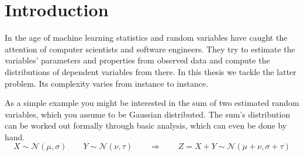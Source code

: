 \documentclass[11pt,a4paper]{book}
\begin{document}
\cleardoublepage

\tableofcontents

\cleardoublepage

\mainmatter
\pagestyle{fancy}

\chapter{Introduction}

In the age of machine learning statistics and random variables have caught the
attention of computer scientists and software engineers. They try to estimate
the variables' parameters and properties from observed data and compute the
distributions of dependent variables from there. In this thesis we tackle the
latter problem. Its complexity varies from instance to instance.

As a simple example you might be interested in the sum of two estimated random
variables, which you assume to be Gaussian distributed. The sum's distribution
can be worked out formally through basic analysis, which can even be done by
hand.
\begin{equation*}
  X \sim \mathcal{N}(\mu, \sigma) \qquad Y \sim \mathcal{N}(\nu, \tau) \qquad \Rightarrow \qquad Z = X + Y \sim \mathcal{N}(\mu + \nu, \sigma + \tau)
\end{equation*}
\end{document}
